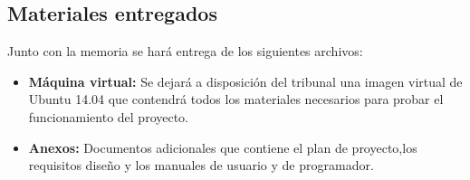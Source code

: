 \subsection{Materiales entregados}
Junto con la memoria se hará entrega de los siguientes archivos:
	\begin{itemize}
	\item \textbf{Máquina virtual:} Se dejará a disposición del tribunal una imagen virtual de Ubuntu 14.04 que contendrá todos los materiales necesarios para probar el funcionamiento del proyecto.
	\item \textbf{Anexos:} Documentos adicionales que contiene el plan de proyecto,los requisitos diseño y los manuales de usuario y de programador.
	\end{itemize}
